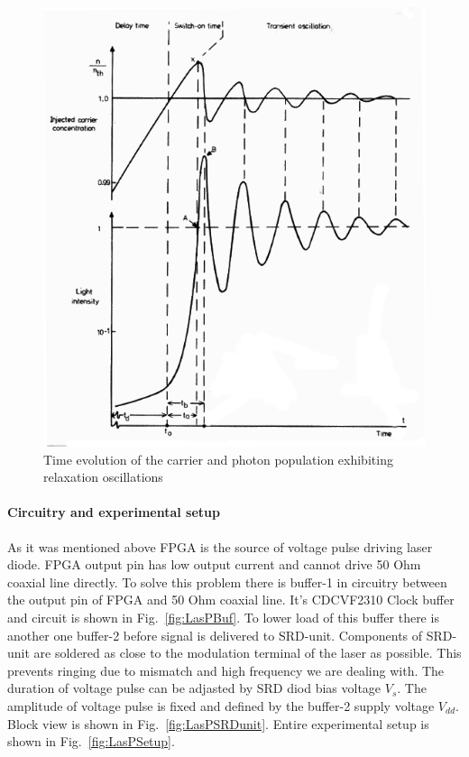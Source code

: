 \begin{figure}
  \centering
  \includegraphics[scale=0.5]{LasPRelaxOsc}
  \caption{Time evolution of the carrier and photon population
    exhibiting relaxation oscillations}
  \label{fig:LasPRelaxOsc}
\end{figure}

\paragraph{Circuitry and experimental setup}
 
As it was mentioned above FPGA is the source of voltage pulse driving
laser diode.  FPGA output pin has low output current and cannot drive
50 Ohm coaxial line directly.  To solve this problem there is buffer-1
in circuitry between the output pin of FPGA and 50 Ohm coaxial
line. It's CDCVF2310 Clock buffer and circuit is shown in
Fig.~\ref{fig:LasPBuf}.  To lower load of this buffer there is another
one buffer-2 before signal is delivered to SRD-unit.  Components of
SRD-unit are soldered as close to the modulation terminal of the laser
as possible. This prevents ringing due to mismatch and high frequency
we are dealing with. The duration of voltage pulse can be adjasted by
SRD diod bias voltage $V_s$. The amplitude of voltage pulse is fixed
and defined by the buffer-2 supply voltage $V_{dd}$.  Block view is
shown in Fig.~\ref{fig:LasPSRDunit}. Entire experimental setup is
shown in Fig.~\ref{fig:LasPSetup}.

